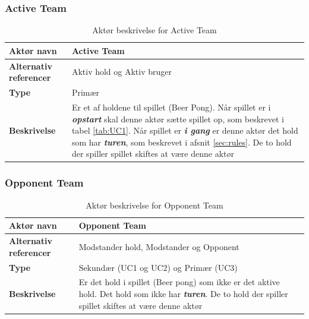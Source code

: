 \documentclass[Kravspecifikation/Kravspec_Main.tex]{subfiles}
\begin{document}
\subsubsection{Active Team}
\begin{table}[H]
    \centering
    \begin{tabular}{|L{0.35\textwidth}|L{0.65\textwidth}|}
        \hline
        \textbf{Aktør navn} & Active Team \\ \hline
        \textbf{Alternativ referencer} & Aktiv hold og Aktiv bruger \\ \hline
        \textbf{Type} & Primær \\ \hline
        \textbf{Beskrivelse} & Er et af holdene til spillet (Beer Pong). Når spillet er i \textbf{\textit{opstart}} skal denne aktør sætte spillet op, som beskrevet i tabel \ref{tab:UC1}. Når spillet er \textbf{\textit{i gang}} er denne aktør det hold som har \textbf{\textit{turen}}, som beskrevet i afsnit \ref{sec:rules}. De to hold der spiller spillet skiftes at være denne aktør \\ \hline
    \end{tabular}
    \caption{Aktør beskrivelse for Active Team}
    \label{tab:ActiveUserBeskrivelse}
\end{table}

\subsubsection{Opponent Team}
\begin{table}[H]
    \centering
    \begin{tabular}{|L{0.35\textwidth}|L{0.65\textwidth}|}
        \hline
        \textbf{Aktør navn} &  Opponent Team\\ \hline
        \textbf{Alternativ referencer} &  Modstander hold, Modstander og Opponent\\ \hline
        \textbf{Type} & Sekundær (UC1 og UC2) og Primær (UC3) \\ \hline
        \textbf{Beskrivelse} & Er det hold i spillet (Beer pong) som ikke er det aktive hold. Det hold som ikke har \textbf{\textit{turen}}. De to hold der spiller spillet skiftes at være denne aktør\\ \hline
    \end{tabular}
    \caption{Aktør beskrivelse for Opponent Team}
    \label{tab:OppponentTeamBeskrivelse}
\end{table}
\end{document}
